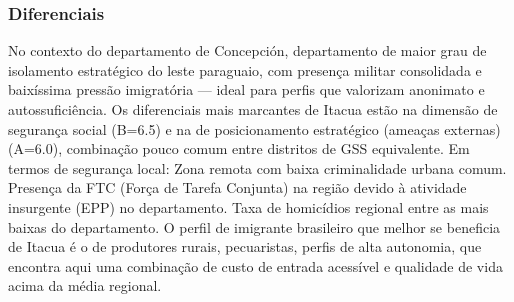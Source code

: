 \subsubsection*{Diferenciais}\label{dif-itacua-0114}
No contexto do departamento de Concepción, departamento de maior grau de isolamento estratégico do leste paraguaio, com presença militar consolidada e baixíssima pressão imigratória — ideal para perfis que valorizam anonimato e autossuficiência. Os diferenciais mais marcantes de Itacua estão na dimensão de segurança social (B=6.5) e na de posicionamento estratégico (ameaças externas) (A=6.0), combinação pouco comum entre distritos de GSS equivalente. Em termos de segurança local: Zona remota com baixa criminalidade urbana comum. Presença da FTC (Força de Tarefa Conjunta) na região devido à atividade insurgente (EPP) no departamento. Taxa de homicídios regional entre as mais baixas do departamento. O perfil de imigrante brasileiro que melhor se beneficia de Itacua é o de produtores rurais, pecuaristas, perfis de alta autonomia, que encontra aqui uma combinação de custo de entrada acessível e qualidade de vida acima da média regional.
